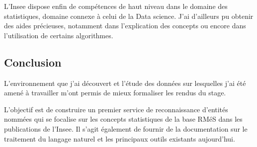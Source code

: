 L'Insee dispose enfin de compétences de haut niveau dans le domaine des statistiques, domaine connexe à celui de la Data science. J'ai d'ailleurs pu obtenir des aides précieuses, notamment dans l'explication des concepts ou encore dans l'utilisation de certains algorithmes.
\newline

\subsection*{Conclusion}
L'environnement que j'ai découvert et l'étude des données sur lesquelles j'ai été amené à travailler m'ont permis de mieux formaliser les rendus du stage.

L'objectif est de construire un premier service de reconnaissance d'entités nommées qui se focalise sur les concepts statistiques de la base RMéS dans les publications de l'Insee. Il s'agit également de fournir de la documentation sur le traitement du langage naturel et les principaux outils existants aujourd'hui.
